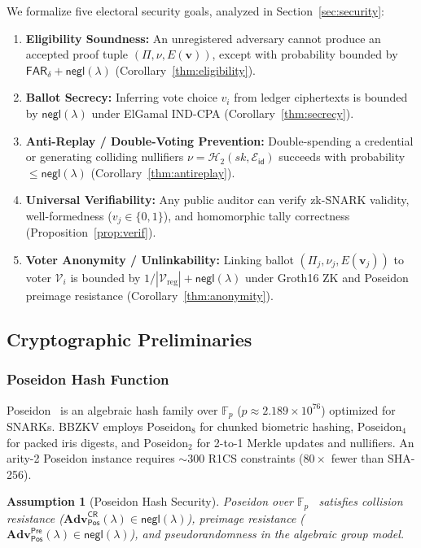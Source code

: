\documentclass[10pt,letterpaper,journal]{IEEEtran}
\newtheorem{assumption}[theorem]{Assumption}
\begin{document}
We formalize five electoral security goals, analyzed in Section~\ref{sec:security}:
\begin{enumerate}[leftmargin=*,noitemsep,topsep=1pt,parsep=0pt]
    \item \textbf{Eligibility Soundness:} An unregistered adversary cannot produce an accepted proof tuple $(\Pi, \nu, E(\mathbf{v}))$, except with probability bounded by $\mathsf{FAR}_\delta + \mathsf{negl}(\lambda)$ (Corollary~\ref{thm:eligibility}).
    \item \textbf{Ballot Secrecy:} Inferring vote choice $v_i$ from ledger ciphertexts is bounded by $\mathsf{negl}(\lambda)$ under ElGamal IND-CPA (Corollary~\ref{thm:secrecy}).
    \item \textbf{Anti-Replay / Double-Voting Prevention:} Double-spending a credential or generating colliding nullifiers $\nu = \mathcal{H}_2(sk, \mathcal{E}_{\mathsf{id}})$ succeeds with probability $\leq \mathsf{negl}(\lambda)$ (Corollary~\ref{thm:antireplay}).
    \item \textbf{Universal Verifiability:} Any public auditor can verify zk-SNARK validity, well-formedness ($v_j \in \{0,1\}$), and homomorphic tally correctness (Proposition~\ref{prop:verif}).
    \item \textbf{Voter Anonymity / Unlinkability:} Linking ballot $(\Pi_j, \nu_j, E(\mathbf{v}_j))$ to voter $\mathcal{V}_i$ is bounded by $1/|\mathcal{V}_{\text{reg}}| + \mathsf{negl}(\lambda)$ under Groth16 ZK and Poseidon preimage resistance (Corollary~\ref{thm:anonymity}).
\end{enumerate}


\subsection{Cryptographic Preliminaries}

\subsubsection{Poseidon Hash Function}
Poseidon~\cite{Grassi2021} is an algebraic hash family over $\mathbb{F}_p$ ($p \approx 2.189 \times 10^{76}$) optimized for SNARKs. \textsc{BBZKV} employs $\text{Poseidon}_8$ for chunked biometric hashing, $\text{Poseidon}_4$ for packed iris digests, and $\text{Poseidon}_2$ for 2-to-1 Merkle updates and nullifiers. An arity-2 Poseidon instance requires $\sim$300 R1CS constraints ($80\times$ fewer than SHA-256).

\begin{assumption}[Poseidon Hash Security]
\label{asm:poseidon}
Poseidon over $\mathbb{F}_p$~\cite{Grassi2021} satisfies collision resistance ($\mathbf{Adv}^{\mathsf{CR}}_{\mathsf{Pos}}(\lambda) \in \mathsf{negl}(\lambda)$), preimage resistance ($\mathbf{Adv}^{\mathsf{Pre}}_{\mathsf{Pos}}(\lambda) \in \mathsf{negl}(\lambda)$), and pseudorandomness in the algebraic group model.
\end{assumption}
\end{document}
